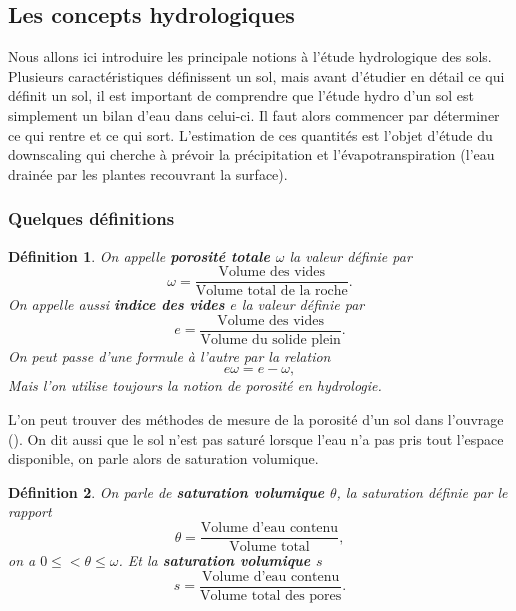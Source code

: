 \documentclass[a4paper,10pt]{article}
\newtheorem{definition}{Définition}
\begin{document}
	\subsection{Les concepts hydrologiques}
	\label{hydro}
	
	Nous allons ici introduire les principale notions à l'étude hydrologique des sols. Plusieurs caractéristiques définissent un sol, mais avant d'étudier en détail ce qui définit un sol, il est important de comprendre que l'étude hydro d'un sol est simplement un bilan d'eau dans celui-ci. Il faut alors commencer par déterminer ce qui rentre et ce qui sort. L'estimation de ces quantités est l'objet d'étude du downscaling qui cherche à prévoir la précipitation et l'évapotranspiration (l'eau drainée par les plantes recouvrant la surface).
	
	\subsubsection{Quelques définitions}
	
	\label{modelisation}
	\begin{definition}
		On appelle \textbf{porosité totale $\omega$} la valeur définie par
		\begin{equation}
			\omega =\frac{\textrm{Volume des vides}}{\textrm{Volume total de la roche}}.
		\end{equation}
		On appelle aussi \textbf{indice des vides $e$} la valeur définie par 
		\begin{equation}
			e=\frac{\textrm{Volume des vides}}{\textrm{Volume du solide plein}}.
		\end{equation}
		On peut passe d'une formule à l'autre par la relation 
		\[e\omega=e-\omega,\]
		Mais l'on utilise toujours la notion de porosité en hydrologie. 
	\end{definition}
	L'on peut trouver des méthodes de mesure de la porosité d'un sol dans l'ouvrage (\cite{marsily_de1986quantitative}). On dit aussi que le sol n'est pas saturé lorsque l'eau n'a pas pris tout l'espace disponible, on parle alors de saturation volumique.
	\begin{definition}
		On parle de \textbf{saturation volumique $\theta$}, la saturation définie par le rapport
		\begin{equation}
			\theta= \frac{\textrm{Volume d'eau contenu}}{\textrm{Volume total}},
		\end{equation}
		on a $0\leq<\theta\leq \omega$. Et la \textbf{saturation volumique $s$}
		\begin{equation}
			s=\frac{\textrm{Volume d'eau contenu}}{\textrm{Volume total des pores}}.
		\end{equation}
	\end{definition}
	
\end{document}
